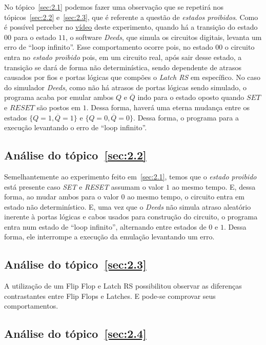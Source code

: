 \documentclass[12pt]{article}
\begin{document}
No tópico~\ref{sec:2.1} podemos fazer uma observação que se repetirá nos
tópicos~\ref{sec:2.2} e~\ref{sec:2.3}, que é referente a questão de
\emph{estados proibidos}. Como é possível perceber no
\href{https://youtu.be/RH6w3QnfUhA}{vídeo} deste experimento, quando há a
transição do estado $00$ para o estado $11$, o software \emph{Deeds}, que simula
os circuitos digitais, levanta um erro de ``loop infinito''. Esse comportamento
ocorre pois, no estado $00$ o circuito entra no \emph{estado proibido} pois, em
um circuito real, após sair desse estado, a transição se dará de forma não
determinística, sendo dependente de atrasos causados por fios e portas lógicas
que compões o \emph{Latch RS} em específico. No caso do simulador \emph{Deeds},
como não há atrasos de portas lógicas sendo simulado, o programa acaba por
emular ambos $Q$ e $\overline{Q}$ indo para o estado oposto quando $SET$ e
$RESET$ são postos em $1$. Dessa forma, haverá uma eterna mudança entre os
estados $\{Q = 1, \overline{Q} = 1\}$ e $\{Q = 0, \overline{Q} = 0\}$. Dessa
forma, o programa para a execução levantando o erro de ``loop infinito''.

\subsection{Análise do tópico~\ref{sec:2.2}}\label{sec:analise2.2}

Semelhantemente ao experimento feito em~\ref{sec:2.1}, temos que o \emph{estado
  proibido} está presente caso \emph{SET} e \emph{RESET} assumam o valor $1$ ao
mesmo tempo. E, dessa forma, ao mudar ambos para o valor $0$ ao mesmo tempo, o
circuito entra em estado não determinístico. E, uma vez que o \emph{Deeds} não
simula atraso aleatório inerente à portas lógicas e cabos usados para construção
do circuito, o programa entra num estado de ``loop infinito'', alternando entre
estados de $0$ e $1$. Dessa forma, ele interrompe a execução da emulação
levantando um erro.

\subsection{Análise do tópico~\ref{sec:2.3}}\label{sec:analise2.3}

A utilização de um Flip Flop e Latch RS possibilitou observar as diferenças
contrastantes entre Flip Flops e Latches. E pode-se comprovar seus
comportamentos.

\subsection{Análise do tópico~\ref{sec:2.4}}\label{sec:analise2.4}
\end{document}
